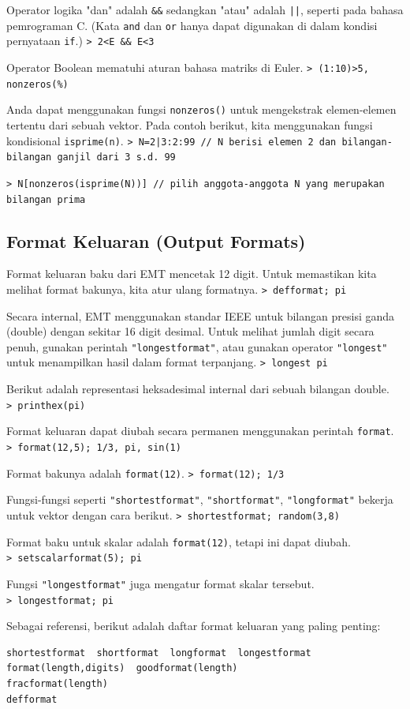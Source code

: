 \documentclass[11pt, a4paper]{article}
\newcommand{\emtcmd}[1]{\noindent\texttt{\textcolor{emtcommand}{>}\ #1}\par\smallskip}
\begin{document}
Operator logika "dan" adalah \texttt{\&\&} sedangkan "atau" adalah \texttt{||}, seperti pada bahasa pemrograman C. (Kata \texttt{and} dan \texttt{or} hanya dapat digunakan di dalam kondisi pernyataan \texttt{if}.)
\emtcmd{2<E \&\& E<3}

Operator Boolean mematuhi aturan bahasa matriks di Euler.
\emtcmd{(1:10)>5, nonzeros(\%)}

Anda dapat menggunakan fungsi \texttt{nonzeros()} untuk mengekstrak elemen-elemen tertentu dari sebuah vektor. Pada contoh berikut, kita menggunakan fungsi kondisional \texttt{isprime(n)}.
\emtcmd{N=2|3:2:99 \textcolor{emtcomment}{// N berisi elemen 2 dan bilangan-bilangan ganjil dari 3 s.d. 99}}
\emtcmd{N[nonzeros(isprime(N))] \textcolor{emtcomment}{// pilih anggota-anggota N yang merupakan bilangan prima}}

\subsection*{Format Keluaran (Output Formats)}

Format keluaran baku dari EMT mencetak 12 digit. Untuk memastikan kita melihat format bakunya, kita atur ulang formatnya.
\emtcmd{defformat; pi}

Secara internal, EMT menggunakan standar IEEE untuk bilangan presisi ganda (double) dengan sekitar 16 digit desimal. Untuk melihat jumlah digit secara penuh, gunakan perintah \texttt{"longestformat"}, atau gunakan operator \texttt{"longest"} untuk menampilkan hasil dalam format terpanjang.
\emtcmd{longest pi}

Berikut adalah representasi heksadesimal internal dari sebuah bilangan double.
\emtcmd{printhex(pi)}

Format keluaran dapat diubah secara permanen menggunakan perintah \texttt{format}.
\emtcmd{format(12,5); 1/3, pi, sin(1)}

Format bakunya adalah \texttt{format(12)}.
\emtcmd{format(12); 1/3}

Fungsi-fungsi seperti \texttt{"shortestformat"}, \texttt{"shortformat"}, \texttt{"longformat"} bekerja untuk vektor dengan cara berikut.
\emtcmd{shortestformat; random(3,8)}

Format baku untuk skalar adalah \texttt{format(12)}, tetapi ini dapat diubah.
\emtcmd{setscalarformat(5); pi}

Fungsi \texttt{"longestformat"} juga mengatur format skalar tersebut.
\emtcmd{longestformat; pi}

Sebagai referensi, berikut adalah daftar format keluaran yang paling penting:
\begin{verbatim}
shortestformat  shortformat  longformat  longestformat
format(length,digits)  goodformat(length)
fracformat(length)
defformat
\end{verbatim}
\end{document}
